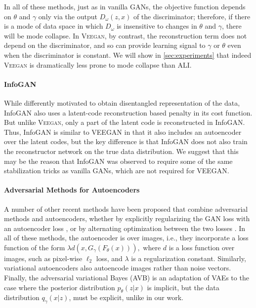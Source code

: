 \documentclass{article}
\newcommand{\acronym}{\textsc{Veegan}\xspace}
\begin{document}
In all of these methods, just as in vanilla GANs,
the objective function
depends on $\theta$ and $\gamma$ only
via the output $D_\omega(z,x)$ of the discriminator; therefore, if there is a mode of data space in which  $D_\omega$ is insensitive
to changes in $\theta$ and  $\gamma$,
there will be mode collapse.
In \acronym, by contrast, the reconstruction term does not depend on the discriminator,
and so can provide learning signal to $\gamma$ or $\theta$ even when
the discriminator is constant.
We will show in \autoref{sec:experiments} that indeed \acronym is dramatically less prone
to mode collapse than ALI.

\paragraph{InfoGAN} While differently motivated to obtain disentangled representation of the data, InfoGAN also uses a latent-code reconstruction based penalty in its cost function. But unlike \acronym, only a part of the latent code is reconstructed in InfoGAN. Thus, InfoGAN is similar to VEEGAN in that it also includes an autoencoder over the latent codes, but the key difference is that InfoGAN does not also train the reconstructor network on the true data distribution. We suggest that this may be the reason that InfoGAN was observed to require some of the same stabilization tricks as vanilla GANs, which are not required for VEEGAN.

\paragraph{Adversarial Methods for Autoencoders}
\label{sec:mode-reg}
A number of other recent methods have been proposed that combine adversarial methods 
and autoencoders, whether by explicitly regularizing
the GAN loss with an autoencoder loss
\citep{Che2017ModeRG,larsen2015autoencoding},
or by alternating optimization between
the two losses \citep{makhzani2015adversarial}.
In all of these methods, the autoencoder is over
images, i.e., they incorporate a loss function 
of the form $\lambda d(x, G_\gamma (F_\theta (x))),$
where $d$ is a loss function over images, such as
pixel-wise $\ell_2$ loss, and $\lambda$
is a regularization constant.
Similarly, variational autoencoders
\cite{kingma14,rezende2014stochastic}
also autoencode images rather than noise vectors.
Finally, the adversarial variational Bayes (AVB) 
 \citep{avb} is an adaptation of VAEs
to the case where the posterior distribution $p_\theta(z|x)$
is implicit, but the data distribution $q_\gamma(x|z)$, must be explicit, unlike in our work.
\end{document}
